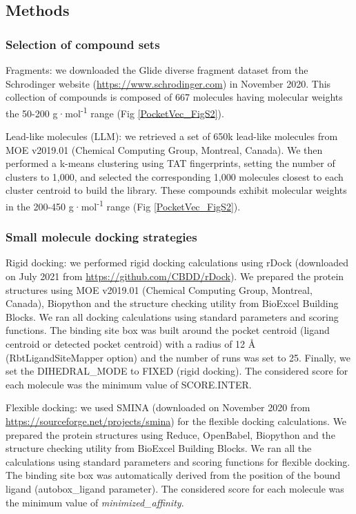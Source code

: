 \subsection{Methods}
\label{PocketVec_Methods}

\subsubsection{Selection of compound sets}

Fragments: we downloaded the Glide\cite{friesner_glide_2004, halgren_glide_2004} diverse fragment dataset from the Schrodinger website (\hyperlink{https://www.schrodinger.com}{https://www.schrodinger.com}) in November 2020. This collection of compounds is composed of 667 molecules having molecular weights the 50-200 g·mol\textsuperscript{-1} range (Fig \ref{PocketVec_FigS2}).

Lead-like molecules (LLM): we retrieved a set of 650k lead-like molecules from MOE v2019.01 (Chemical Computing Group, Montreal, Canada). We then performed a k-means clustering using TAT fingerprints, setting the number of clusters to 1,000, and selected the corresponding 1,000 molecules closest to each cluster centroid to build the library. These compounds exhibit molecular weights in the 200-450 g·mol\textsuperscript{-1} range (Fig \ref{PocketVec_FigS2}). 

\subsubsection{Small molecule docking strategies}

Rigid docking: we performed rigid docking calculations using rDock\cite{ruiz-carmona_rdock_2014} (downloaded on July 2021 from \hyperlink{https://github.com/CBDD/rDock}{https://github.com/CBDD/rDock}). We prepared the protein structures using MOE v2019.01 (Chemical Computing Group, Montreal, Canada), Biopython\cite{cock_biopython_2009} and the structure checking utility from BioExcel Building Blocks\cite{andrio_bioexcel_2019}. We ran all docking calculations using standard parameters and scoring functions. The binding site box was built around the pocket centroid (ligand centroid or detected pocket centroid) with a radius of 12 Å (RbtLigandSiteMapper option) and the number of runs was set to 25. Finally, we set the DIHEDRAL\_MODE to FIXED (rigid docking). The considered score for each molecule was the minimum value of SCORE.INTER.

Flexible docking: we used SMINA\cite{koes_lessons_2013} (downloaded on November 2020 from \hyperlink{https://sourceforge.net/projects/smina}{https://sourceforge.net/projects/smina}) for the flexible docking calculations. We prepared the protein structures using Reduce\cite{word_asparagine_1999}, OpenBabel\cite{oboyle_open_2011}, Biopython\cite{cock_biopython_2009} and the structure checking utility from BioExcel Building Blocks\cite{andrio_bioexcel_2019}. We ran all the calculations using standard parameters and scoring functions for flexible docking. The binding site box was automatically derived from the position of the bound ligand (autobox\_ligand parameter). The considered score for each molecule was the minimum value of \textit{minimized\_affinity}. 


